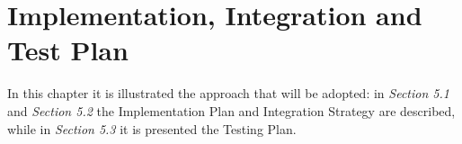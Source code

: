 \chapter{Implementation, Integration and Test Plan}

In this chapter it is illustrated the approach that will be adopted: in \textit{Section 5.1} and \textit{Section 5.2} the Implementation Plan and Integration Strategy are described, while in \textit{Section 5.3} it is presented the Testing Plan.



